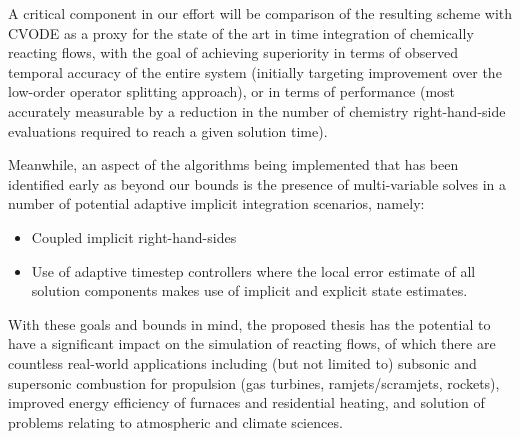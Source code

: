 A critical component in our effort will be comparison of the resulting scheme with CVODE as
a proxy for the state of the art in time integration of chemically reacting
flows, with the goal of achieving superiority in terms of observed temporal accuracy
of the entire system (initially targeting improvement over the low-order operator splitting approach),
or in terms of performance (most accurately measurable by a reduction in the number of chemistry
right-hand-side evaluations required to reach a given solution time).

Meanwhile, an aspect of the algorithms being implemented that has been identified
early as beyond our bounds is the presence of multi-variable solves in a number of
potential adaptive implicit integration scenarios, namely:
\begin{itemize}
\item{Coupled implicit right-hand-sides}
\item{Use of adaptive timestep controllers where the local error estimate
      of all solution components makes use of implicit and explicit state
      estimates.}
\end{itemize}
With these goals and bounds in mind, the proposed thesis has the potential to
have a significant impact on the simulation of reacting flows, of which there
are countless real-world applications including (but not limited to) subsonic
and supersonic combustion for propulsion (gas turbines, ramjets/scramjets,
rockets), improved energy efficiency of furnaces and residential heating, and
solution of problems relating to atmospheric and climate sciences.

